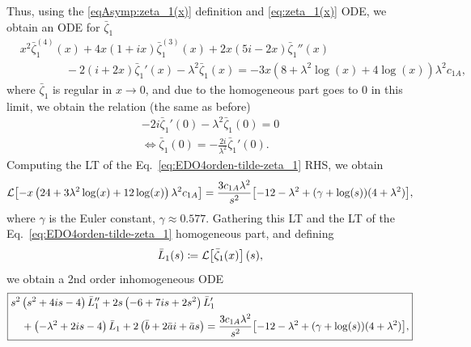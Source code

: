 \documentclass[%
 aip,
 jmp,%
 amsmath,amssymb,
 reprint,%
]{revtex4-2}
\begin{document}
Thus, using the \eqref{eqAsymp:zeta_1(x)} definition and \eqref{eq:zeta_1(x)} ODE, we obtain an ODE for $\bar{\zeta}_1$
\begin{equation}\label{eq:EDO4orden-tilde-zeta_1}
\boxed{\begin{aligned}
& x^2\bar{\zeta}_1^{(4)}(x) + 4x(1+ ix)\bar{\zeta}_1^{(3)}(x) + 2x (5i-2x)\bar{\zeta}_1''(x) \\
& \qquad\qquad - 2(i+2x)\bar{\zeta}_1'(x) - \lambda^2\bar{\zeta}_1(x)=-3x \left(8 + \lambda^2 \log (x) + 4 \log (x)\right)\lambda^2c_{1A},
\end{aligned}}
\end{equation}
where $\bar{\zeta}_1$ is regular in $x \to 0$, and due to the homogeneous part goes to $0$ in this limit, we obtain the relation (the same as before)
\begin{equation}\label{eq:rel-zeta1-zeta1'-bar}
\begin{gathered}
    -2i\bar{\zeta}_1'(0) - \lambda^2\bar{\zeta}_1(0) = 0\\
    \Leftrightarrow \bar{\zeta}_1(0) = -\frac{2i}{\lambda^2}\bar{\zeta}_1'(0).
\end{gathered}
\end{equation}
Computing the LT of the Eq.~\eqref{eq:EDO4orden-tilde-zeta_1} RHS, we obtain
\begin{equation}
    \mathcal{L}\qty[-x \left(24+3 \lambda^2 \log (x)+12 \log (x)\right)\lambda^2c_{1A}] = \frac{3c_{1A}\lambda^2}{s^2}\qty[-12 - \lambda^2 + \qty(\gamma + \log(s))(4 + \lambda^2)],
\end{equation}
where $\gamma$ is the Euler constant, $\gamma \approx 0.577$. Gathering this LT and the LT of the Eq.~\eqref{eq:EDO4orden-tilde-zeta_1} homogeneous part, and defining
\begin{equation}
    \bar{L}_1(s) \coloneq \mathcal{L}\qty[\bar{\zeta}_{1}(x)](s),
\end{equation}
we obtain a 2nd order inhomogeneous ODE
\begin{equation}
\boxed{\begin{aligned}
& s^2 \left(s^2+4is -4\right)\bar{L}_1'' + 2s \left(-6+7is+2s^2\right)\bar{L}_1' \\
& \quad + \left(-\lambda^2+2is-4\right)\bar{L}_1+2\left(\bar{b}+2\bar{a}i+\bar{a}s\right) = \frac{3c_{1A}\lambda^2}{s^2}\qty[-12 - \lambda^2 + \qty(\gamma + \log(s))(4 + \lambda^2)],
\end{aligned}}
\end{equation}
\end{document}
